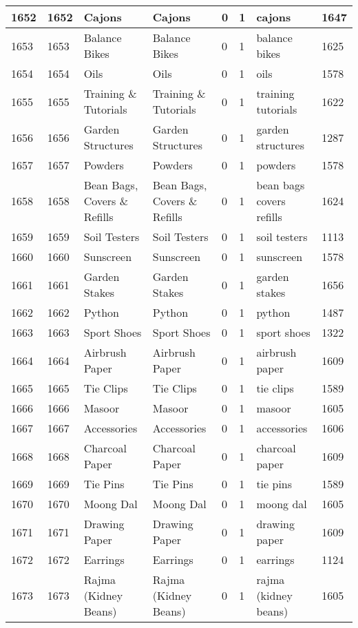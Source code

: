 \begin{longtable}{|l|l|l|l|l|l|l|l|}
1652 & 1652 & Cajons & Cajons & 0 & 1 & cajons & 1647 \\ \hline 
1653 & 1653 & Balance Bikes & Balance Bikes & 0 & 1 & balance bikes & 1625 \\ \hline 
1654 & 1654 & Oils & Oils & 0 & 1 & oils & 1578 \\ \hline 
1655 & 1655 & Training \& Tutorials & Training \& Tutorials & 0 & 1 & training tutorials & 1622 \\ \hline 
1656 & 1656 & Garden Structures & Garden Structures & 0 & 1 & garden structures & 1287 \\ \hline 
1657 & 1657 & Powders & Powders & 0 & 1 & powders & 1578 \\ \hline 
1658 & 1658 & Bean Bags, Covers \& Refills & Bean Bags, Covers \& Refills & 0 & 1 & bean bags covers refills & 1624 \\ \hline 
1659 & 1659 & Soil Testers & Soil Testers & 0 & 1 & soil testers & 1113 \\ \hline 
1660 & 1660 & Sunscreen & Sunscreen & 0 & 1 & sunscreen & 1578 \\ \hline 
1661 & 1661 & Garden Stakes & Garden Stakes & 0 & 1 & garden stakes & 1656 \\ \hline 
1662 & 1662 & Python & Python & 0 & 1 & python & 1487 \\ \hline 
1663 & 1663 & Sport Shoes & Sport Shoes & 0 & 1 & sport shoes & 1322 \\ \hline 
1664 & 1664 & Airbrush Paper & Airbrush Paper & 0 & 1 & airbrush paper & 1609 \\ \hline 
1665 & 1665 & Tie Clips & Tie Clips & 0 & 1 & tie clips & 1589 \\ \hline 
1666 & 1666 & Masoor & Masoor & 0 & 1 & masoor & 1605 \\ \hline 
1667 & 1667 & Accessories & Accessories & 0 & 1 & accessories & 1606 \\ \hline 
1668 & 1668 & Charcoal Paper & Charcoal Paper & 0 & 1 & charcoal paper & 1609 \\ \hline 
1669 & 1669 & Tie Pins & Tie Pins & 0 & 1 & tie pins & 1589 \\ \hline 
1670 & 1670 & Moong Dal & Moong Dal & 0 & 1 & moong dal & 1605 \\ \hline 
1671 & 1671 & Drawing Paper & Drawing Paper & 0 & 1 & drawing paper & 1609 \\ \hline 
1672 & 1672 & Earrings & Earrings & 0 & 1 & earrings & 1124 \\ \hline 
1673 & 1673 & Rajma (Kidney Beans) & Rajma (Kidney Beans) & 0 & 1 & rajma (kidney beans) & 1605 \\ \hline 

\end{longtable}
